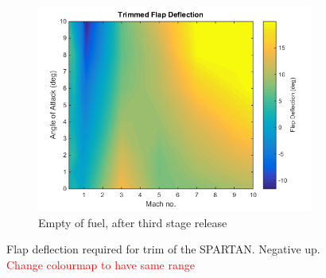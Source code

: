 \begin{figure}
\begin{subfigure}{.5\textwidth}
				\centering
				\includegraphics[width=0.99\linewidth]{figures/3_vehicle_design/FlapDeflection}
				\caption{Empty of fuel, after third stage release}
				\label{fig:FlapDeflectionEngineOff}
			\end{subfigure}
			\caption{Flap deflection required for trim of the SPARTAN. Negative up. \textcolor{red}{Change colourmap to have same range}}
			\label{fig:FlapDeflection}
		\end{figure}
		
		
		
		
		
		
